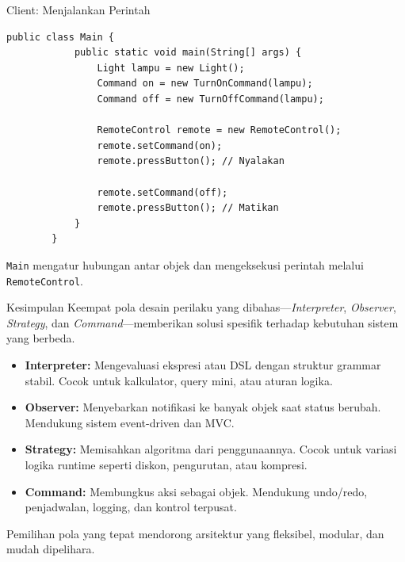 \documentclass[aspectratio=169, table]{beamer}
\begin{document}
\begin{frame}[fragile]{Client: Menjalankan Perintah}
	\begin{lstlisting}[style=JavaStyle]
		public class Main {
			public static void main(String[] args) {
				Light lampu = new Light();
				Command on = new TurnOnCommand(lampu);
				Command off = new TurnOffCommand(lampu);
				
				RemoteControl remote = new RemoteControl();
				remote.setCommand(on);
				remote.pressButton(); // Nyalakan
				
				remote.setCommand(off);
				remote.pressButton(); // Matikan
			}
		}
	\end{lstlisting}
	\small \texttt{Main} mengatur hubungan antar objek dan mengeksekusi perintah melalui \texttt{RemoteControl}.
\end{frame}

\begin{frame}{Kesimpulan}
	\vspace{10pt}
	Keempat pola desain perilaku yang dibahas—\textit{Interpreter}, \textit{Observer}, \textit{Strategy}, dan \textit{Command}—memberikan solusi spesifik terhadap kebutuhan sistem yang berbeda.
	
	\vspace{8pt}
	\begin{itemize}
		\item \textbf{Interpreter:} Mengevaluasi ekspresi atau DSL dengan struktur grammar stabil. Cocok untuk kalkulator, query mini, atau aturan logika.
		
		\item \textbf{Observer:} Menyebarkan notifikasi ke banyak objek saat status berubah. Mendukung sistem event-driven dan MVC.
		
		\item \textbf{Strategy:} Memisahkan algoritma dari penggunaannya. Cocok untuk variasi logika runtime seperti diskon, pengurutan, atau kompresi.
		
		\item \textbf{Command:} Membungkus aksi sebagai objek. Mendukung undo/redo, penjadwalan, logging, dan kontrol terpusat.
	\end{itemize}
	
	\vspace{6pt}
	Pemilihan pola yang tepat mendorong arsitektur yang fleksibel, modular, dan mudah dipelihara.
\end{frame}




\end{document}

